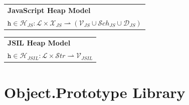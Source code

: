 \documentclass[a4paper,11pt,twoside]{report}
\begin{document}
\begin{center}
\begin{tabular}{p{9cm}} \hline
\textbf{JavaScript Heap Model} \\
$\texttt{h} \in \mathcal{H}_{JS} : \mathcal{L} \times \mathcal{X}_{JS} \rightharpoonup (\mathcal{V}_{JS} \cup \mathcal{S}ch_{JS} \cup \mathcal{D}_{JS})$  \\ \hline
\end{tabular}
\vspace{0.3cm}
\begin{tabular}{p{9cm}} \hline
\textbf{JSIL Heap Model} \\
$\texttt{h} \in \mathcal{H}_{JSIL} : \mathcal{L} \times \mathcal{S}tr \rightharpoonup \mathcal{V}_{JSIL}  $  \\ \hline
\end{tabular}
\end{center}

\chapter{Object.Prototype Library}
\end{document}
